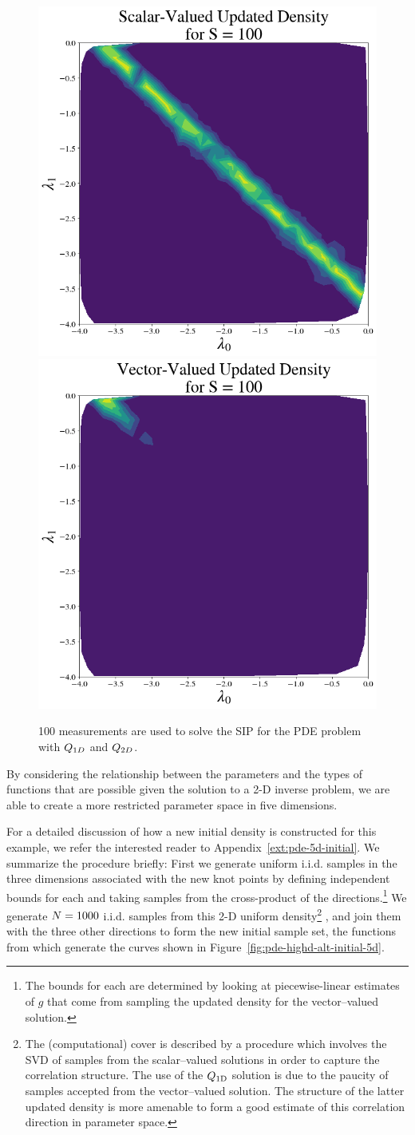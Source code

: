 \begin{figure}
\centering
  \includegraphics[width=0.45\linewidth]{figures/pde-highd/pde-highd_updated_D2_scalar.png}
  \includegraphics[width=0.45\linewidth]{figures/pde-highd/pde-highd_updated_D2_vector.png}
\caption{
100 measurements are used to solve the SIP for the PDE problem with $Q_{1D}$ and $Q_{2D}$.
}
\label{fig:pde-highd-2d-updated}
\end{figure}

By considering the relationship between the parameters and the types of functions that are possible given the solution to a 2-D inverse problem, we are able to create a more restricted parameter space in five dimensions.

For a detailed discussion of how a new initial density is constructed for this example, we refer the interested reader to Appendix~\ref{ext:pde-5d-initial}.
We summarize the procedure briefly:
First we generate uniform i.i.d. samples in the three dimensions associated with the new knot points by defining independent bounds for each and taking samples from the cross-product of the directions.\footnote{
The bounds for each are determined by looking at piecewise-linear estimates of $g$ that come from sampling the updated density for the vector--valued solution.
}
We generate $N=1000$ i.i.d. samples from this 2-D uniform density\footnote{
The (computational) cover is described by a procedure which involves the SVD of samples from the scalar--valued solutions in order to capture the correlation structure.
The use of the $Q_\text{1D}$ solution is due to the paucity of samples accepted from the vector--valued solution.
The structure of the latter updated density is more amenable to form a good estimate of this correlation direction in parameter space.
}
, and join them with the three other directions to form the new initial sample set, the functions from which generate the curves shown in Figure~\ref{fig:pde-highd-alt-initial-5d}.

